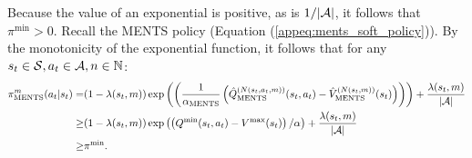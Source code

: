 \begin{proofoutline}
            Because the value of an exponential is positive, as is $1/|\mathcal{A}|$, it follows that $\pi^{\min}>0.$ Recall the MENTS policy (Equation (\ref{appeq:ments_soft_policy})). By the monotonicity of the exponential function, it follows that for any $s_t\in\mathcal{S}, a_t\in\mathcal{A}, n\in\mathbb{N}$:
            \begin{align}
                {\pi^{m}_{{\textnormal{MENTS}}}}(a_t|s_t) 
                    =& (1-\lambda(s_t,m))\exp\left(\left(\frac{1}{{\alpha_{{\textnormal{MENTS}}}}}\left({\hat{Q}^{(N(s_t,a_t,m))}_{{\textnormal{MENTS}}}}(s_t,a_t)-{\hat{V}^{(N(s_t,m))}_{{\textnormal{MENTS}}}}(s_t)\right)\right)\right) 
                        + \frac{\lambda(s_t,m)}{|\mathcal{A}|} \\
                    \geq& (1-\lambda(s_t,m))\exp\left(\left(Q^{\min}(s_t,a_t)-V^{\max}(s_t)\right)/\alpha\right) 
                        + \frac{\lambda(s_t,m)}{|\mathcal{A}|} \\
                    \geq& \pi^{\min}.
            \end{align}
        \end{proofoutline}
            
            





